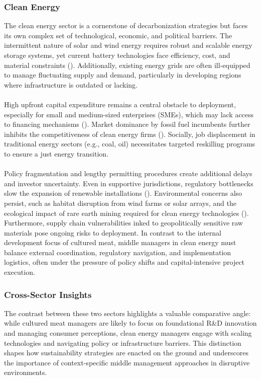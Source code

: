 	\subsubsection{Clean Energy}
	The clean energy sector is a cornerstone of decarbonization strategies but faces its own complex set of technological, economic, and political barriers. The intermittent nature of solar and wind energy requires robust and scalable energy storage systems, yet current battery technologies face efficiency, cost, and material constraints (\textcite{Zhang2016, IEA2021}). Additionally, existing energy grids are often ill-equipped to manage fluctuating supply and demand, particularly in developing regions where infrastructure is outdated or lacking.
	
	\paragraph*{} High upfront capital expenditure remains a central obstacle to deployment, especially for small and medium-sized enterprises (SMEs), which may lack access to financing mechanisms (\textcite{Mngumi2022}). Market dominance by fossil fuel incumbents further inhibits the competitiveness of clean energy firms (\textcite{IRENA2017}). Socially, job displacement in traditional energy sectors (e.g., coal, oil) necessitates targeted reskilling programs to ensure a just energy transition.
	
	\paragraph*{} Policy fragmentation and lengthy permitting procedures create additional delays and investor uncertainty. Even in supportive jurisdictions, regulatory bottlenecks slow the expansion of renewable installations (\textcite{Zhang2016}). Environmental concerns also persist, such as habitat disruption from wind farms or solar arrays, and the ecological impact of rare earth mining required for clean energy technologies (\textcite{IEA2021}). Furthermore, supply chain vulnerabilities inked to geopolitically sensitive raw materials pose ongoing risks to deployment. In contrast to the internal development focus of cultured meat, middle managers in clean energy must balance external coordination, regulatory navigation, and implementation logistics, often under the pressure of policy shifts and capital-intensive project execution.
	
	\subsubsection{Cross-Sector Insights}
	The contrast between these two sectors highlights a valuable comparative angle: while cultured meat managers are likely to focus on foundational R\&D innovation and managing consumer perceptions, clean energy managers engage with scaling technologies and navigating policy or infrastructure barriers. This distinction shapes how sustainability strategies are enacted on the ground and underscores the importance of context-specific middle management approaches in disruptive environments.
	
